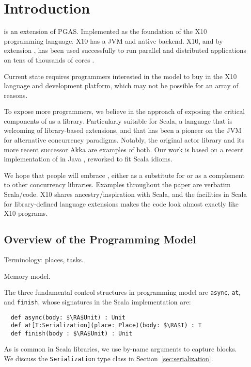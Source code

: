 \section{Introduction}

\apgas is an extension of PGAS. Implemented as the foundation of the X10
programming language. X10 has a JVM and native backend. X10, and by extension
\apgas, has been used successfully to run parallel and distributed applications
on tens of thousands of cores \cite{TardieuETAL14X10ApgasAtPetascale}.

Current state requires programmers interested in the \apgas model to buy in the
X10 language and development platform, which may not be possible for an array
of reasons.

To expose more programmers, we believe in the approach of exposing the critical
components of \apgas as a library. Particularly suitable for Scala, a language
that is welcoming of library-based extensions, and that has been a pioneer on
the JVM for alternative concurrency paradigms. Notably, the original actor
library and its more recent successor Akka are examples of both. Our work is
based on a recent implementation of \apgas in Java \cite{APGASJava}, reworked to
fit Scala idioms.

We hope that people will embrace \apgas, either as a substitute for or as a
complement to other concurrency libraries. Examples throughout the paper are
verbatim Scala/\apgas code. X10 shares ancestry/inspiration with Scala, and the
facilities in Scala for library-defined language extensions makes the code look
almost exactly like X10 programs.

\subsection{Overview of the \apgas Programming Model}

Terminology: places, tasks.

Memory model.

The three fundamental control structures in programming model are
\lstinline{async}, \lstinline{at}, and \lstinline{finish}, whose signatures in
the Scala implementation are:
\begin{lstlisting}
  def async(body: $\RA$Unit) : Unit
  def at[T:Serialization](place: Place)(body: $\RA$T) : T
  def finish(body : $\RA$Unit) : Unit
\end{lstlisting}
As is common in Scala libraries, we use by-name arguments to capture blocks.
We discuss the \lstinline{Serialization} type class in
Section~\ref{sec:serialization}.

